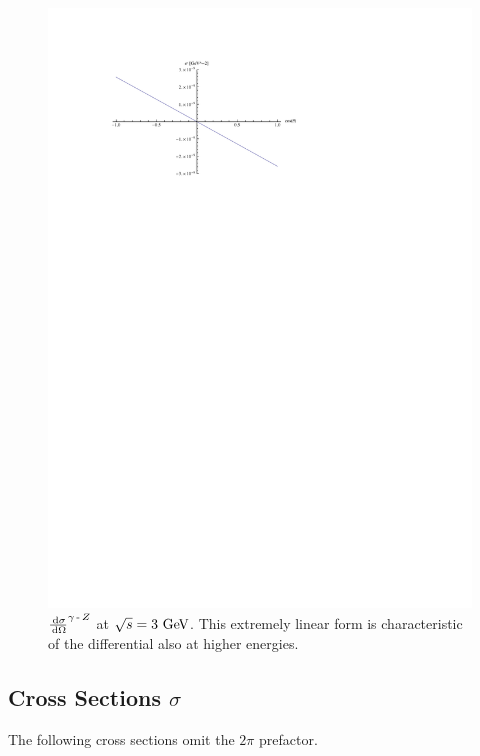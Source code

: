 \documentclass[]{article}
\begin{document}
\begin{figure}[H]
	\vspace{10pt}
	\centering
	\includegraphics[scale=1.4]{diff_gamma_z}
	\caption{$\frac{\,\operatorname{d}\!{\sigma}}{\,\operatorname{d}\!{\Omega}}^{\gamma\operatorname{-}Z }$ at $\sqrt{s}=3\GeV$. This extremely linear form is characteristic of the differential also at higher energies.}
	\label{fig:diffgammaz}
\end{figure}


\subsection{Cross Sections $\sigma$}

The following cross sections omit the $2\pi$ prefactor.
\end{document}
